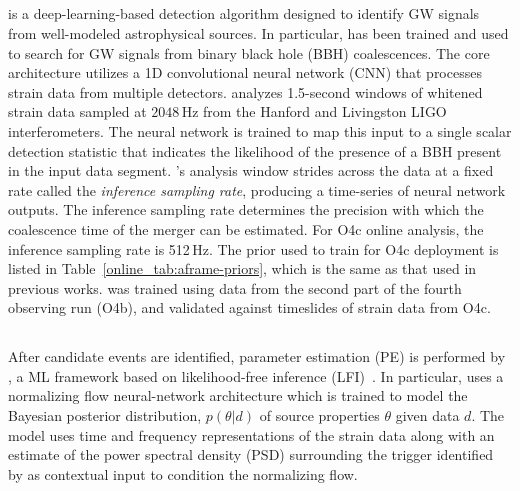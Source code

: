 \begin{refsection}
\subsection{\aframe}
\aframe is a deep-learning-based detection algorithm designed to identify GW signals from well-modeled astrophysical sources. 
In particular, \aframe has been trained and used to search for GW signals from binary black hole (BBH) coalescences. 
The core architecture utilizes a 1D convolutional neural network (CNN) that processes strain data from multiple detectors. 
\aframe analyzes 1.5-second windows of whitened strain data sampled at $2048$\,Hz from the Hanford and Livingston LIGO interferometers. 
The neural network is trained to map this input to a single scalar detection statistic that indicates the likelihood of the presence of a BBH present in the input data segment. 
\aframe's analysis window strides across the data at a fixed rate called the \emph{inference sampling rate}, producing a time-series of neural network outputs. 
The inference sampling rate determines the precision with which the coalescence time of the merger can be estimated. 
For O4c online analysis, the inference sampling rate is 512\,Hz. 
The prior used to train \aframe for O4c deployment is listed in Table~\ref{online_tab:aframe-priors}, which is the same as that used in previous works.
\aframe was trained using data from the second part of the fourth observing run (O4b), and validated against timeslides of strain data from O4c.

\subsection{\amplfi}
After candidate events are identified, parameter estimation (PE) is performed by \amplfi, a ML framework based on likelihood-free inference (LFI)~\cite{amplfi, Marx:2025ioo}. 
In particular, \amplfi uses a normalizing flow neural-network architecture which is trained to model the Bayesian posterior distribution, $p(\theta\lvert d)$ of source properties $\theta$ given data $d$. 
The model uses time and frequency representations of the strain data along with an estimate of the power spectral density (PSD) surrounding the trigger identified by \aframe as contextual input to condition the normalizing flow. 


\end{refsection}
